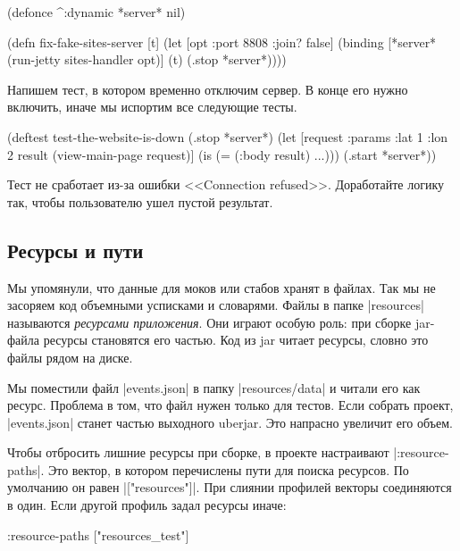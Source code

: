 \begin{english}
  \begin{clojure}
(defonce ^:dynamic *server* nil)

(defn fix-fake-sites-server [t]
  (let [opt {:port 8808 :join? false}]
    (binding [*server* (run-jetty sites-handler opt)]
      (t)
      (.stop *server*))))
  \end{clojure}
\end{english}

Напишем тест, в котором временно отключим сервер. В конце его нужно включить,
иначе мы испортим все следующие тесты.

\begin{english}
  \begin{clojure}
(deftest test-the-website-is-down
  (.stop *server*)
  (let [request {:params {:lat 1 :lon 2}}
        result (view-main-page request)]
    (is (= (:body result) {...})))
  (.start *server*))
  \end{clojure}
\end{english}

Тест не сработает из-за ошибки <<Connection refused>>. Доработайте логику так,
чтобы пользователю ушел пустой результат.

\subsection{Ресурсы и пути}

Мы упомянули, что данные для моков или стабов хранят в файлах. Так мы не
засоряем код объемными усписками и словарями. Файлы в папке \spverb|resources|
называются \emph{ресурсами приложения}. Они играют особую роль: при сборке
jar-файла ресурсы становятся его частью. Код из jar читает ресурсы, словно это
файлы рядом на диске.

Мы поместили файл \spverb|events.json| в папку \spverb|resources/data| и читали
его как ресурс. Проблема в том, что файл нужен только для тестов. Если собрать
проект, \spverb|events.json| станет частью выходного uberjar. Это напрасно
увеличит его объем.

Чтобы отбросить лишние ресурсы при сборке, в проекте настраивают
\spverb|:resource-paths|. Это вектор, в котором перечислены пути для поиска
ресурсов. По умолчанию он равен \spverb|["resources"]|. При слиянии профилей
векторы соединяются в один. Если другой профиль задал ресурсы иначе:

\begin{english}
  \begin{clojure}
:resource-paths ["resources_test"]
  \end{clojure}
\end{english}

